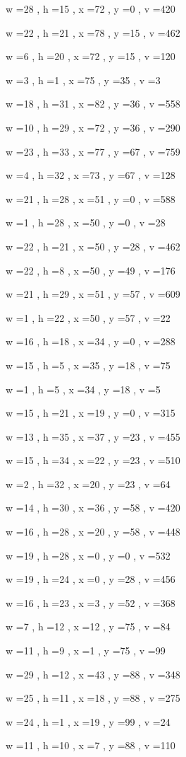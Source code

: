 \documentclass[11pt]{article}
\begin{document}
w =28 , h =15 , x =72 , y =0 , v =420
\par
w =22 , h =21 , x =78 , y =15 , v =462
\par
w =6 , h =20 , x =72 , y =15 , v =120
\par
w =3 , h =1 , x =75 , y =35 , v =3
\par
w =18 , h =31 , x =82 , y =36 , v =558
\par
w =10 , h =29 , x =72 , y =36 , v =290
\par
w =23 , h =33 , x =77 , y =67 , v =759
\par
w =4 , h =32 , x =73 , y =67 , v =128
\par
w =21 , h =28 , x =51 , y =0 , v =588
\par
w =1 , h =28 , x =50 , y =0 , v =28
\par
w =22 , h =21 , x =50 , y =28 , v =462
\par
w =22 , h =8 , x =50 , y =49 , v =176
\par
w =21 , h =29 , x =51 , y =57 , v =609
\par
w =1 , h =22 , x =50 , y =57 , v =22
\par
w =16 , h =18 , x =34 , y =0 , v =288
\par
w =15 , h =5 , x =35 , y =18 , v =75
\par
w =1 , h =5 , x =34 , y =18 , v =5
\par
w =15 , h =21 , x =19 , y =0 , v =315
\par
w =13 , h =35 , x =37 , y =23 , v =455
\par
w =15 , h =34 , x =22 , y =23 , v =510
\par
w =2 , h =32 , x =20 , y =23 , v =64
\par
w =14 , h =30 , x =36 , y =58 , v =420
\par
w =16 , h =28 , x =20 , y =58 , v =448
\par
w =19 , h =28 , x =0 , y =0 , v =532
\par
w =19 , h =24 , x =0 , y =28 , v =456
\par
w =16 , h =23 , x =3 , y =52 , v =368
\par
w =7 , h =12 , x =12 , y =75 , v =84
\par
w =11 , h =9 , x =1 , y =75 , v =99
\par
w =29 , h =12 , x =43 , y =88 , v =348
\par
w =25 , h =11 , x =18 , y =88 , v =275
\par
w =24 , h =1 , x =19 , y =99 , v =24
\par
w =11 , h =10 , x =7 , y =88 , v =110
\par
\newpage
\end{document}
